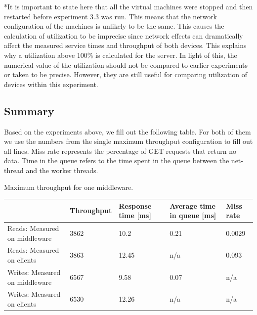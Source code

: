\documentclass[11pt,a4paper]{article}
\begin{document}
*It is important to state here that all the virtual machines were stopped and then restarted before experiment 3.3 was run. This means that the network configuration of the machines is unlikely to be the same. This causes the calculation of utilization to be imprecise since network effects can dramatically affect the measured service times and throughput of both devices. This explains why a utilization above 100\% is calculated for the server. In light of this, the numerical value of the utilization should not be compared to earlier experiments or taken to be precise. However, they are still useful for comparing utilization of devices within this experiment.


\newpage

\subsection{Summary}

Based on the experiments above, we fill out the following table. For both of them we use the numbers from the single maximum throughput configuration to fill out all lines. Miss rate represents the percentage of GET requests that return no data. Time in the queue refers to the time spent in the queue between the net-thread and the worker threads.




\begin{center}
	{Maximum throughput for one middleware.}
	\begin{tabular}{|l|p{2cm}|p{2cm}|p{2.5cm}|p{1.5cm}|}
		\hline                                & Throughput & Response time [ms] & Average time in queue [ms] & Miss rate \\ 
		\hline Reads: Measured on middleware  &   3862     &     10.2      &   0.21             &  0.0029         \\ 
		\hline Reads: Measured on clients     &   3863     &     12.45     & n/a               &  0.093    \\ 
		\hline Writes: Measured on middleware &   6567     &     9.58      &   0.07            & n/a       \\ 
		\hline Writes: Measured on clients    &   6530     &     12.26      & n/a              & n/a       \\ 
		\hline 
	\end{tabular}
\end{center}
\end{document}
